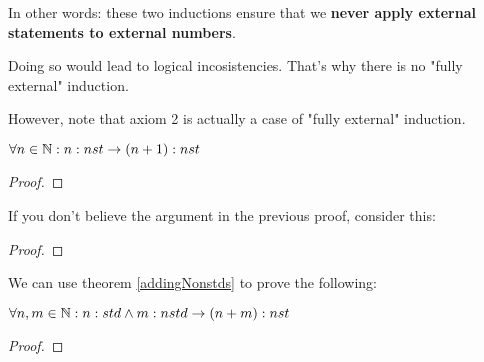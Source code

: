 In other words: these two inductions ensure that we \textbf{never apply external statements to external numbers}. 

Doing so would lead to logical incosistencies. That's why there is no "fully external" induction.

However, note that axiom 2 is actually a case of "fully external" induction.


\begin{theorem}
    $ \forall n \in \mathbb{N}: n:nst \to (n+1):nst $ \label{addingNonstds}
\end{theorem}
\begin{proof}
\end{proof}

If you don't believe the argument in the previous proof, consider this: 
\begin{proof}
\end{proof}


We can use theorem \ref{addingNonstds} to prove the following: 

\begin{theorem}
    $\forall n, m \in \mathbb{N}: n:std \land m:nstd \to (n+m):nst$
\end{theorem}
\begin{proof}
\end{proof}

